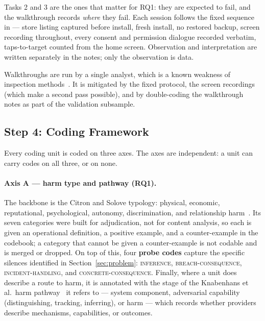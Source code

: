 Tasks 2 and 3 are the ones that matter for RQ1: they are expected to fail, and
the walkthrough records \emph{where} they fail. Each session follows the fixed
sequence in  --- store
listing captured before install, fresh install, no restored backup, screen
recording throughout, every consent and permission dialogue recorded verbatim,
taps-to-target counted from the home screen. Observation and interpretation are
written separately in the notes; only the observation is data.

Walkthroughs are run by a single analyst, which is a known weakness of
inspection methods~\parencite{nielsen1994heuristic}. It is mitigated by the
fixed protocol, the screen recordings (which make a second pass possible), and
by double-coding the walkthrough notes as part of the validation subsample.

\subsection{Step 4: Coding Framework}
\label{sec:framework}

Every coding unit is coded on three axes. The axes are independent: a unit can
carry codes on all three, or on none.

\paragraph{Axis A --- harm type and pathway (RQ1).}
The backbone is the Citron and Solove typology: physical, economic,
reputational, psychological, autonomy, discrimination, and relationship
harm~\parencite{citron2021harms}. Its seven categories were built for
adjudication, not for content analysis, so each is given an operational
definition, a positive example, and a counter-example in the codebook; a
category that cannot be given a counter-example is not codable and is merged or
dropped. On top of this, four \textbf{probe codes} capture the specific silences
identified in Section~\ref{sec:problem}: \textsc{inference},
\textsc{breach-consequence}, \textsc{incident-handling}, and
\textsc{concrete-consequence}. Finally, where a unit does describe a route to
harm, it is annotated with the stage of the Knabenhans et al.\ harm
pathway~\parencite{knabenhans2026harms} it refers to --- system component,
adversarial capability (distinguishing, tracking, inferring), or harm --- which
records whether providers describe mechanisms, capabilities, or outcomes.


